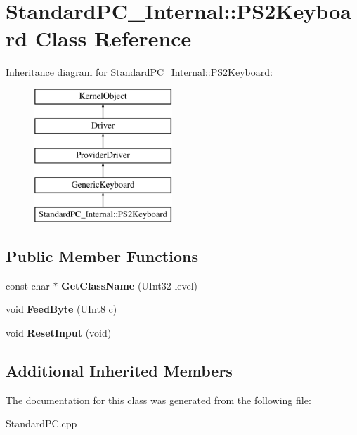 \hypertarget{class_standard_p_c___internal_1_1_p_s2_keyboard}{}\section{Standard\+P\+C\+\_\+\+Internal\+:\+:P\+S2\+Keyboard Class Reference}
\label{class_standard_p_c___internal_1_1_p_s2_keyboard}
Inheritance diagram for Standard\+P\+C\+\_\+\+Internal\+:\+:P\+S2\+Keyboard\+:\begin{figure}[H]
\begin{center}
\leavevmode
\includegraphics[height=5.000000cm]{class_standard_p_c___internal_1_1_p_s2_keyboard}
\end{center}
\end{figure}
\subsection*{Public Member Functions}
\begin{DoxyCompactItemize}
\item 
\mbox{\label{class_standard_p_c___internal_1_1_p_s2_keyboard_a97f6613334bd97626a8b9c6142027bf8}} 
const char $\ast$ {\bfseries Get\+Class\+Name} (U\+Int32 level)
\item 
\mbox{\label{class_standard_p_c___internal_1_1_p_s2_keyboard_ae8d9ad5f5ab1d25453174880cd4a0da5}} 
void {\bfseries Feed\+Byte} (U\+Int8 c)
\item 
\mbox{\label{class_standard_p_c___internal_1_1_p_s2_keyboard_a053934f0f6910de675afd328e63d3adc}} 
void {\bfseries Reset\+Input} (void)
\end{DoxyCompactItemize}
\subsection*{Additional Inherited Members}


The documentation for this class was generated from the following file\+:\begin{DoxyCompactItemize}
\item 
Standard\+P\+C.\+cpp\end{DoxyCompactItemize}
